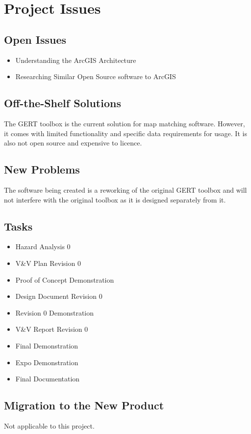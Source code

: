 \documentclass[12pt, titlepage]{article}
\begin{document}
\section{Project Issues}

\subsection{Open Issues}
\begin{itemize}
    \item Understanding the ArcGIS Architecture 
    \item Researching Similar Open Source software to ArcGIS
\end{itemize}

\subsection{Off-the-Shelf Solutions}
The GERT toolbox is the current solution for map matching software. However, it comes with limited functionality and specific data requirements for usage. It is also not open source and expensive to licence. 
\subsection{New Problems}
The software being created is a reworking of the original GERT toolbox and will not interfere with the original toolbox as it is designed separately from it.
\subsection{Tasks}
\begin{itemize}
    \item Hazard Analysis 0
    \item V&V Plan Revision 0
    \item Proof of Concept Demonstration
    \item Design Document Revision 0
    \item Revision 0 Demonstration
    \item V&V Report Revision 0
    \item Final Demonstration
    \item Expo Demonstration
    \item Final Documentation
\end{itemize}
\subsection{Migration to the New Product}
Not applicable to this project. 
\end{document}
